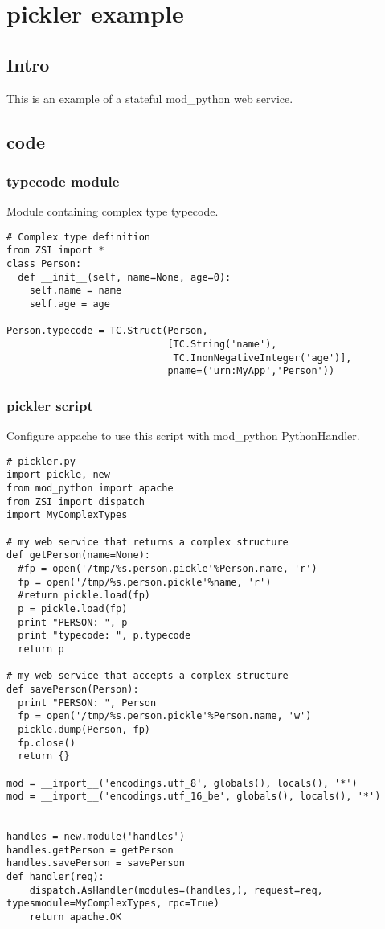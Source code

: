 \chapter{pickler example}

\section{Intro} This is an example of a stateful mod_python web service.

\section{code}
\subsection{typecode module} Module containing complex type typecode.
\begin{verbatim}
# Complex type definition
from ZSI import *
class Person:
  def __init__(self, name=None, age=0):
    self.name = name
    self.age = age

Person.typecode = TC.Struct(Person,
                            [TC.String('name'),
                             TC.InonNegativeInteger('age')],
                            pname=('urn:MyApp','Person'))
\end{verbatim}
\subsection{pickler script} Configure appache to use this script with mod_python
PythonHandler.
\begin{verbatim}
# pickler.py
import pickle, new
from mod_python import apache
from ZSI import dispatch
import MyComplexTypes

# my web service that returns a complex structure
def getPerson(name=None):
  #fp = open('/tmp/%s.person.pickle'%Person.name, 'r')
  fp = open('/tmp/%s.person.pickle'%name, 'r')
  #return pickle.load(fp)
  p = pickle.load(fp)
  print "PERSON: ", p
  print "typecode: ", p.typecode
  return p

# my web service that accepts a complex structure
def savePerson(Person):
  print "PERSON: ", Person
  fp = open('/tmp/%s.person.pickle'%Person.name, 'w')
  pickle.dump(Person, fp)
  fp.close()
  return {}

mod = __import__('encodings.utf_8', globals(), locals(), '*')
mod = __import__('encodings.utf_16_be', globals(), locals(), '*')


handles = new.module('handles')
handles.getPerson = getPerson
handles.savePerson = savePerson
def handler(req):
    dispatch.AsHandler(modules=(handles,), request=req, typesmodule=MyComplexTypes, rpc=True)
    return apache.OK

\end{verbatim}

